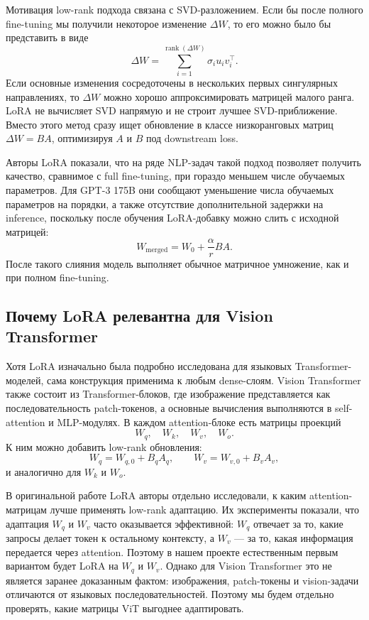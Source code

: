 \documentclass[]{scrartcl}
\begin{document}
Мотивация low-rank подхода связана с SVD-разложением. Если бы после полного
fine-tuning мы получили некоторое изменение $\Delta W$, то его можно было бы
представить в виде
\[
    \Delta W
    =
    \sum_{i=1}^{\operatorname{rank}(\Delta W)}
    \sigma_i u_i v_i^\top.
\]
Если основные изменения сосредоточены в нескольких первых сингулярных
направлениях, то $\Delta W$ можно хорошо аппроксимировать матрицей малого
ранга. LoRA не вычисляет SVD напрямую и не строит лучшее SVD-приближение.
Вместо этого метод сразу ищет обновление в классе низкоранговых матриц
$\Delta W = BA$, оптимизируя $A$ и $B$ под downstream loss.

Авторы LoRA показали, что на ряде NLP-задач такой подход позволяет получить
качество, сравнимое с full fine-tuning, при гораздо меньшем числе обучаемых
параметров. Для GPT-3 175B они сообщают уменьшение числа обучаемых параметров
на порядки, а также отсутствие дополнительной задержки на inference, поскольку
после обучения LoRA-добавку можно слить с исходной матрицей:
\[
    W_{\text{merged}}
    =
    W_0 + \frac{\alpha}{r}BA.
\]
После такого слияния модель выполняет обычное матричное умножение, как и при
полном fine-tuning.

\subsection{Почему LoRA релевантна для Vision Transformer}

Хотя LoRA изначально была подробно исследована для языковых Transformer-моделей,
сама конструкция применима к любым dense-слоям. Vision Transformer также состоит
из Transformer-блоков, где изображение представляется как последовательность
patch-токенов, а основные вычисления выполняются в self-attention и MLP-модулях.
В каждом attention-блоке есть матрицы проекций
\[
    W_q,\quad W_k,\quad W_v,\quad W_o.
\]
К ним можно добавить low-rank обновления:
\[
    W_q = W_{q,0} + B_qA_q,
    \qquad
    W_v = W_{v,0} + B_vA_v,
\]
и аналогично для $W_k$ и $W_o$.

В оригинальной работе LoRA авторы отдельно исследовали, к каким attention-матрицам
лучше применять low-rank адаптацию. Их эксперименты показали, что адаптация
$W_q$ и $W_v$ часто оказывается эффективной: $W_q$ отвечает за то, какие запросы
делает токен к остальному контексту, а $W_v$ --- за то, какая информация передается
через attention. Поэтому в нашем проекте естественным первым вариантом будет
LoRA на $W_q$ и $W_v$. Однако для Vision Transformer это не является заранее
доказанным фактом: изображения, patch-токены и vision-задачи отличаются от
языковых последовательностей. Поэтому мы будем отдельно проверять, какие матрицы
ViT выгоднее адаптировать.
\end{document}
